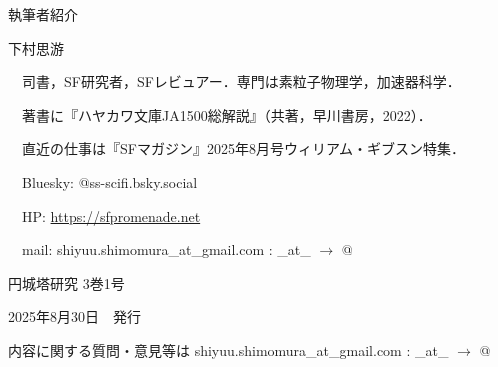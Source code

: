 \documentclass[10pt, a5paper, twoside]{jsarticle}
\theoremstyle{definition}
\begin{document}




	{\large 執筆者紹介}

	\vspace{3mm}

	下村思游

	　司書，SF研究者，SFレビュアー．専門は素粒子物理学，加速器科学．

	　著書に『ハヤカワ文庫JA1500総解説』（共著，早川書房，2022）．

	　直近の仕事は『SFマガジン』2025年8月号ウィリアム・ギブスン特集．

	　Bluesky: @ss-scifi.bsky.social

	　HP: \url{https://sfpromenade.net}

	　mail: shiyuu.shimomura\_at\_gmail.com : \_at\_ $\rightarrow$ @

	\vfill

	\hrulefill

	\center

	{\Large 円城塔研究 3巻1号}

	2025年8月30日　発行


	\hrulefill

	内容に関する質問・意見等は shiyuu.shimomura\_at\_gmail.com : \_at\_ $\rightarrow$ @
\end{document}
